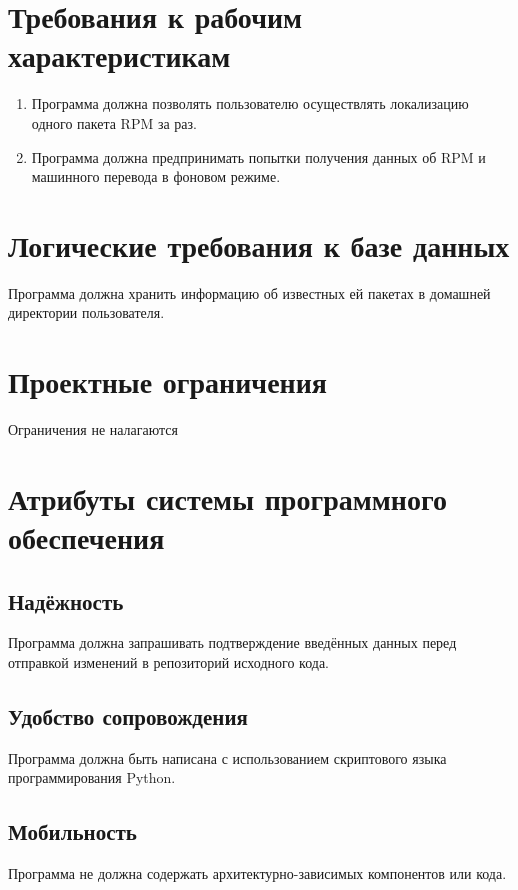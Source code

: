 \documentclass[a4paper,10pt]{report}
\begin{document}
\section{Требования к рабочим характеристикам}
\begin{enumerate}
	\item Программа должна позволять пользователю осуществлять локализацию одного пакета RPM за раз.
	\item Программа должна предпринимать попытки получения данных об RPM и машинного перевода в фоновом режиме.
\end{enumerate}



\section{Логические требования к базе данных}
Программа должна хранить информацию об известных ей пакетах в домашней директории пользователя.

\section{Проектные ограничения}
Ограничения не налагаются

\section{Атрибуты системы программного обеспечения}
\subsection{Надёжность}
Программа должна запрашивать подтверждение введённых данных перед отправкой изменений в репозиторий исходного кода.

\subsection{Удобство сопровождения}
Программа должна быть написана с использованием скриптового языка программирования Python.

\subsection{Мобильность}
Программа не должна содержать архитектурно-зависимых компонентов или кода.
\end{document}

